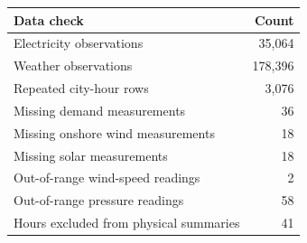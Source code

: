 \begin{tabular}{lr}
\toprule
Data check & Count \\
\midrule
Electricity observations & 35,064 \\
Weather observations & 178,396 \\
Repeated city-hour rows & 3,076 \\
Missing demand measurements & 36 \\
Missing onshore wind measurements & 18 \\
Missing solar measurements & 18 \\
Out-of-range wind-speed readings & 2 \\
Out-of-range pressure readings & 58 \\
Hours excluded from physical summaries & 41 \\
\bottomrule
\end{tabular}
